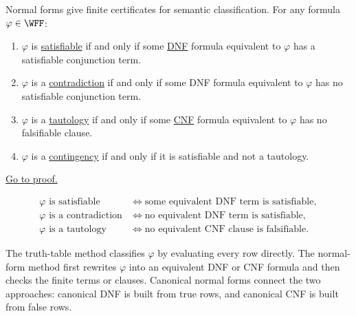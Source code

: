 \begin{tcolorbox}[colback=thmbox, colframe=thmborder, arc=2pt, left=6pt, right=6pt, top=4pt, bottom=4pt, title={\small\textbf{Theorem (Semantic Classification by Normal Forms)}}]
\begin{theorem}
\label{thm:normal-form-semantic-classification-propositional-logic}
Normal forms give finite certificates for semantic classification. For any
formula \(\varphi\in\WFF\):
\begin{enumerate}
  \item \(\varphi\) is
  \hyperref[def:satisfiable-formula-propositional-logic]{satisfiable} if and
  only if some
  \hyperref[def:disjunctive-normal-form-propositional-logic]{DNF} formula
  equivalent to \(\varphi\) has a satisfiable conjunction term.
  \item \(\varphi\) is a
  \hyperref[def:contradiction-propositional-logic]{contradiction} if and only
  if some DNF formula equivalent to \(\varphi\) has no satisfiable conjunction
  term.
  \item \(\varphi\) is a
  \hyperref[def:tautology-propositional-logic]{tautology} if and only if some
  \hyperref[def:conjunctive-normal-form-propositional-logic]{CNF} formula
  equivalent to \(\varphi\) has no falsifiable clause.
  \item \(\varphi\) is a
  \hyperref[def:contingency-propositional-logic]{contingency} if and only if it
  is satisfiable and not a tautology.
\end{enumerate}
\noindent\hyperref[prf:normal-form-semantic-classification-propositional-logic]{Go to proof.}
\end{theorem}
\end{tcolorbox}

\begin{remark*}
\[
\begin{aligned}
\varphi\text{ is satisfiable}
&\Longleftrightarrow
\text{some equivalent DNF term is satisfiable},\\
\varphi\text{ is a contradiction}
&\Longleftrightarrow
\text{no equivalent DNF term is satisfiable},\\
\varphi\text{ is a tautology}
&\Longleftrightarrow
\text{no equivalent CNF clause is falsifiable}.
\end{aligned}
\]
\end{remark*}

\begin{remark*}[Interpretation]
The truth-table method classifies \(\varphi\) by evaluating every row directly.
The normal-form method first rewrites \(\varphi\) into an equivalent DNF or CNF
formula and then checks the finite terms or clauses. Canonical normal forms
connect the two approaches: canonical DNF is built from true rows, and
canonical CNF is built from false rows.
\end{remark*}

